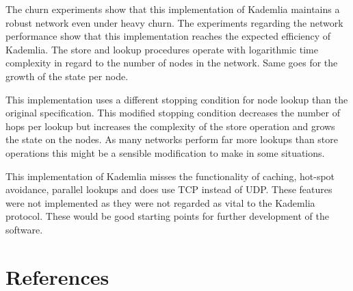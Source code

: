 \documentclass[a4paper, 12pt]{article} %
\begin{document}

The churn experiments show that this implementation of Kademlia maintains a robust network even under heavy churn. The experiments regarding the network performance show that this implementation reaches the expected efficiency of Kademlia. The store and lookup procedures operate with logarithmic time complexity in regard to the number of nodes in the network. Same goes for the growth of the state per node. 


This implementation uses a different stopping condition for node lookup than the original specification. This modified stopping condition decreases the number of hops per lookup but increases the complexity of the store operation and grows the state on the nodes. As many networks perform far more lookups than store operations this might be a sensible modification to make in some situations. 


This implementation of Kademlia misses the functionality of caching, hot-spot avoidance, parallel lookups and does use TCP instead of UDP. These features were not implemented as they were not regarded as vital to the Kademlia protocol. These would be good starting points for further development of the software.


\newpage
\section{References}
\printbibliography[heading=none]
\end{document}
